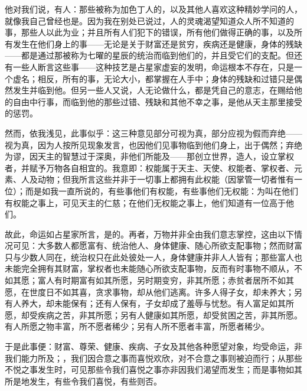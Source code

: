 他对我们说，有人：那些被称为加色丁人的，以及其他人喜欢这种精妙学问的人，就像我自己曾经也是。因为我在别处已说过，人的灵魂渴望知道众人所不知道的事，那些人以此为业；并且所有人们犯下的错误，所有他们做得正确的事，以及所有发生在他们身上的事——无论是关于财富还是贫穷，疾病还是健康，身体的残缺——都是通过那被称为七曜的星辰的统治而临到他们的，并且受它们的支配。但还有一些人断言这些事——这种技艺是占星家虚妄的发明，命运根本不存在，只是一个虚名；相反，所有的事，无论大小，都掌握在人手中；身体的残缺和过错只是偶然发生并临到他。但另一些人又说，人无论做什么，都是凭自己的意志，在赐给他的自由中行事，而临到他的那些过错、残缺和其他不幸之事，是他从天主那里接受的惩罚。\par

然而，依我浅见，此事似乎：这三种意见部分可视为真，部分应视为假而弃绝——视为真，因为人按所见现象发言，也因他们见事物临到他们身上，出于偶然；弃绝为谬，因天主的智慧过于深奥，非他们所能及——那创立世界，造人，设立掌权者，并赋予万物各自相宜的。我意即：权能属于天主、天使、权能者、掌权者、元素、人及动物；但我所言这些并非于一切事上都拥有此权能（因掌管一切者惟有一位）；而是如我一直所说的，有些事他们有权能，有些事他们无权能：为叫在他们有权能之事上，可见天主的仁慈；在他们无权能之事上，他们知道有一位高于他们。\par

故此，命运如占星家所言，是的。再者，万物并非全由我们意志掌控，这由以下情况可见：大多数人都愿富有、统治他人、身体健康、随心所欲支配事物；然而财富只与少数人同在，统治权只在此处彼处一人，身体健康并非人人皆有；那些富人也未能完全拥有其财富，掌权者也未能随心所欲支配事物，反而有时事物不顺从，不如其愿；富人有时期富有如其所愿，另时期变穷，非其所愿；赤贫者居所不如其愿，在世度日不如其喜，贪求事物，却从他们逃离。许多人得子女，却未养大；另有人养大，却未能保有；还有人保有，子女却成了羞辱与忧愁。有人富足如其所愿，却受疾病之苦，非其所愿；另有人健康如其所愿，却受贫困之苦，非其所愿。有人所愿之物丰富，所不愿者稀少；另有人所不愿者丰富，所愿者稀少。\par

于是此事便：财富、尊荣、健康、疾病、子女及其他各种愿望对象，均受命运，非我们能力所及；，我们因合意之事而喜悦欢欣，对不合意之事则被迫而行；从那些不悦之事发生时，可见那些令我们喜悦之事亦非因我们渴望而发生；而是事物如其所是地发生，有些令我们喜悦，有些则否。\par

